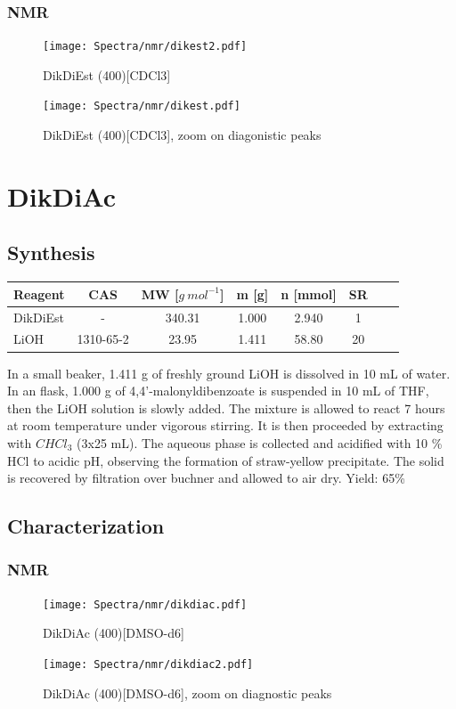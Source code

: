 \documentclass[../Master.tex]{subfiles}
\begin{document}
\subsubsection{NMR}
\begin{figure}[h!]
	\centering
	\texttt{[image: Spectra/nmr/dikest2.pdf]}
	\caption{DikDiEst (400)[CDCl3]}
\end{figure}
\begin{figure}[h!]
	\centering
	\texttt{[image: Spectra/nmr/dikest.pdf]}
	\caption{DikDiEst (400)[CDCl3], zoom on diagonistic peaks}
\end{figure}

\newpage
\section{DikDiAc}
\subsection{Synthesis}

\begin{center}
	\begin{tabular}[b]{lccccccc}
		\toprule
		Reagent  & CAS       & MW [\(g \ mol^{-1}\)] & m [g] & n [mmol] & SR \\
		\midrule
		DikDiEst & -         & 340.31                & 1.000 & 2.940    & 1  \\
		LiOH     & 1310-65-2 & 23.95                 & 1.411 & 58.80    & 20 \\
		\bottomrule
	\end{tabular}
\end{center}

In a small beaker, 1.411 g of freshly ground LiOH is dissolved in 10 mL of water. In an flask, 1.000 g of 4,4'-malonyldibenzoate is suspended in 10 mL of THF, then the LiOH solution is slowly added. The mixture is allowed to react 7 hours at room temperature under vigorous stirring. It is then proceeded by extracting with \(CHCl_{3}\) (3x25 mL). The aqueous phase is collected and acidified with 10 \% HCl to acidic pH, observing the formation of straw-yellow precipitate. The solid is recovered by filtration over buchner and allowed to air dry. Yield: 65\%

\newpage
\subsection{Characterization}
\subsubsection{NMR}
\begin{figure}[h!]
	\centering
	\texttt{[image: Spectra/nmr/dikdiac.pdf]}
	\caption{DikDiAc (400)[DMSO-d6]}
\end{figure}
\begin{figure}[h!]
	\centering
	\texttt{[image: Spectra/nmr/dikdiac2.pdf]}
	\caption{DikDiAc (400)[DMSO-d6], zoom on diagnostic peaks}
\end{figure}
\end{document}
